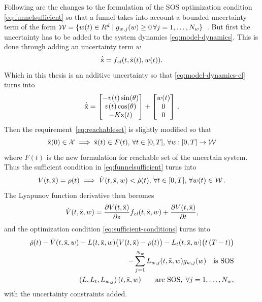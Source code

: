 Following are the changes to the formulation of the \ac{SOS} optimization
condition \cref{eq:funnelsufficient} so that a funnel takes into account a
bounded uncertainty term of the form \(\mathcal{W} = \lbrace w(t) \in R^d \mid
  g_{w,j}(w) \geq 0\, \forall j =
  1,\ldots,N_w\rbrace\)~\cite{majumdarRobustOnlineMotion2013}. But first the
uncertainty has to be added to the system dynamics \cref{eq:model-dynamics}.
This is done through adding an uncertainty term \(w\)
\begin{equation}
  \dot{\bar{{\mathbf{\mathsf{x}}}}} = f_{\mathit{cl}}(t, \bar{{\mathbf{\mathsf{x}}}}(t), w(t)).
\end{equation}
Which in this thesis is an additive uncertainty so that
\cref{eq:model-dynamics-cl} turns into
\begin{equation}
  \dot{\bar{\vect{x}}} = %
  \begin{bmatrix}
    -v(t)\sin(\theta) \\
    v(t)\cos(\theta) \\
    -K\vect{x} (t) \\
  \end{bmatrix}
  +
  \begin{bmatrix}
    w(t) \\
    0 \\
    0
  \end{bmatrix} \mathEoS
\end{equation}
Then the requirement~\eqref{eq:reachableset} is slightly modified so that
\begin{equation}
  \label{eq:uncertain-reachableset}
  \bar{{\mathbf{\mathsf{x}}}}(0) \in \mathcal{X} \implies \bar{{\mathbf{\mathsf{x}}}}(t) \in F(t),\, \forall t \in
  [0,T], \, \forall w \colon [0,T] \rightarrow \mathcal{W}
\end{equation} 
where \(F(t)\) is the new formulation for reachable set of the uncertain system.
Thus the sufficient condition in \cref{eq:funnelsufficient} turns into
\begin{equation}
  \label{eq:funneluncertain-sufficient}
  V(t,\bar{{\mathbf{\mathsf{x}}}}) = \rho(t) \implies \dot{V}(t,\bar{{\mathbf{\mathsf{x}}}},w) < \dot{\rho}(t), \, \forall t \in [0,T], \, \forall w(t) \in \mathcal{W} \, .
\end{equation}
The Lyapunov function derivative then becomes
\begin{equation}
  \dot{V}(t,\bar{{\mathbf{\mathsf{x}}}}, w) = \frac{\partial V(t,\bar{{\mathbf{\mathsf{x}}}})}{\partial {\mathbf{\mathsf{x}}}} f_{\mathit{cl}}(t,\bar{{\mathbf{\mathsf{x}}}},w) + \frac{\partial V(t,\bar{{\mathbf{\mathsf{x}}}})}{\partial t},
\end{equation}
and the optimization condition \cref{eq:sufficient-conditions} turns into
\begin{align}
  \label{eq:optimizationconditionuncertain}
  \dot{\rho}(t) - \dot{V}(t,\bar{{\mathbf{\mathsf{x}}}},w) - L(t,\bar{{\mathbf{\mathsf{x}}}},w) \bigl( V(t,\bar{{\mathbf{\mathsf{x}}}}) - \rho(t) \bigr) - L_{t}(t,\bar{{\mathbf{\mathsf{x}}}},w) \bigl( t\left( T - t \right) \bigr)  & \nonumber \\
  - \sum_{j=1}^{N_{w}} L_{w,j}(t,\bar{{\mathbf{\mathsf{x}}}},w)g_{w,j}(w) \quad \text{is SOS} &  \\
  \left( L, L_t, L_{w,j} \right) (t,\bar{{\mathbf{\mathsf{x}}}},w) \qquad \text{are SOS}, \; \forall j = 1,\ldots,N_w, \nonumber
\end{align}
with the uncertainty constraints added.


